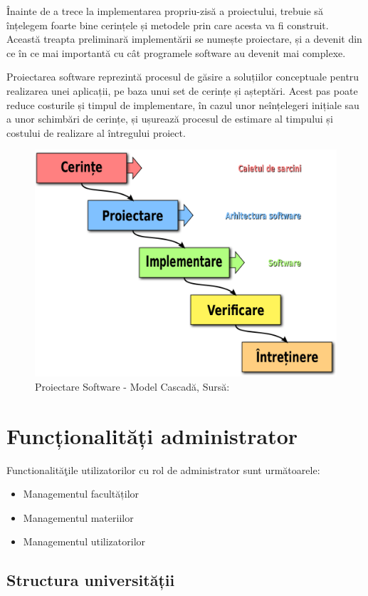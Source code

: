 \documentclass[12pt, a4paper, oneside, romanian]{teza-upb}
\begin{document}
Înainte de a trece la implementarea propriu-zisă a proiectului, trebuie să înțelegem foarte bine cerințele și metodele prin care acesta va fi construit. Această treapta preliminară implementării se numește proiectare, și a devenit din ce în ce mai importantă cu cât programele software au devenit mai complexe.

Proiectarea software reprezintă procesul de găsire a soluțiilor conceptuale pentru realizarea unei aplicații, pe baza unui set de cerințe și așteptări. Acest pas poate reduce costurile și timpul de implementare, în cazul unor neînțelegeri inițiale sau a unor schimbări de cerințe, și ușurează procesul de estimare al timpului și costului de realizare al întregului proiect.

\begin{figure}[H]
\centering
\includegraphics*[width=0.55\columnwidth]{proiectare-software-model-cascada}
\caption{Proiectare Software - Model Cascadă, Sursă: \cite{proiectaresoftwaremodelcascada}}
\label{proiectare-software-model-cascada}
\end{figure}

\section{Funcționalități administrator}

Functionalităţile utilizatorilor cu rol de administrator sunt următoarele:
\begin{itemize}
	\item Managementul facultăților
	\item Managementul materiilor
	\item Managementul utilizatorilor
\end{itemize}

\subsection{Structura universității}
\end{document}
